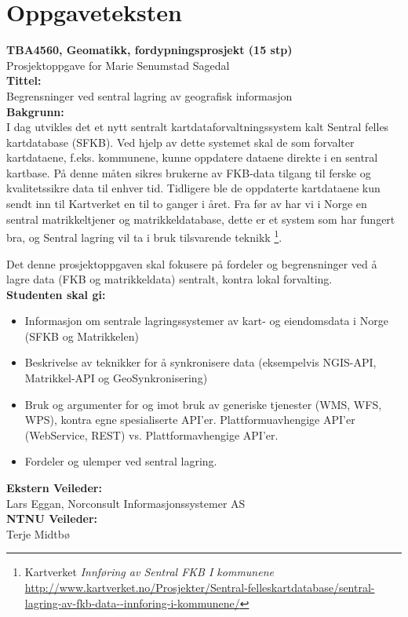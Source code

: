\chapter{Oppgaveteksten}
\textbf{TBA4560, Geomatikk, fordypningsprosjekt (15 stp)}\\
	Prosjektoppgave for
	Marie Senumstad Sagedal\\

\noindent\textbf{Tittel:}\\
	Begrensninger ved sentral lagring av geografisk informasjon\\

\noindent\textbf{Bakgrunn:}\\
	I dag utvikles det et nytt sentralt kartdataforvaltningssystem kalt Sentral felles kartdatabase (SFKB). Ved hjelp av dette systemet skal de som forvalter kartdataene, f.eks. kommunene, kunne oppdatere dataene direkte i en sentral kartbase. På denne måten sikres brukerne av FKB-data tilgang til ferske og kvalitetssikre data til enhver tid. Tidligere ble de oppdaterte kartdataene kun sendt inn til Kartverket en til to ganger i året. Fra før av har vi i Norge en sentral matrikkeltjener og matrikkeldatabase, dette er et system som har fungert bra, og Sentral lagring vil ta i bruk tilsvarende teknikk \footnote{ Kartverket \textit{Innføring av Sentral FKB I kommunene} \url{http://www.kartverket.no/Prosjekter/Sentral-felleskartdatabase/sentral-lagring-av-fkb-data--innforing-i-kommunene/}}.

Det denne prosjektoppgaven skal fokusere på fordeler og begrensninger ved å 	lagre data (FKB og matrikkeldata) sentralt, kontra lokal forvalting.\\

\noindent\textbf{Studenten skal gi:}
\begin{itemize}
	\item Informasjon om sentrale lagringssystemer av kart- og eiendomsdata i Norge (SFKB og   Matrikkelen)
	\item Beskrivelse av teknikker for å synkronisere data (eksempelvis NGIS-API, Matrikkel-API og GeoSynkronisering)
	\item Bruk og argumenter for og imot bruk av generiske tjenester (WMS, WFS, WPS), kontra egne spesialiserte API'er. Plattformuavhengige API'er (WebService, REST) vs. Plattformavhengige API'er.
	\item Fordeler og ulemper ved sentral lagring.\\
\end{itemize}

\noindent\textbf{Ekstern Veileder:}\\
	Lars Eggan, Norconsult Informasjonssystemer AS\\

\noindent\textbf{NTNU Veileder:}\\
Terje Midtbø